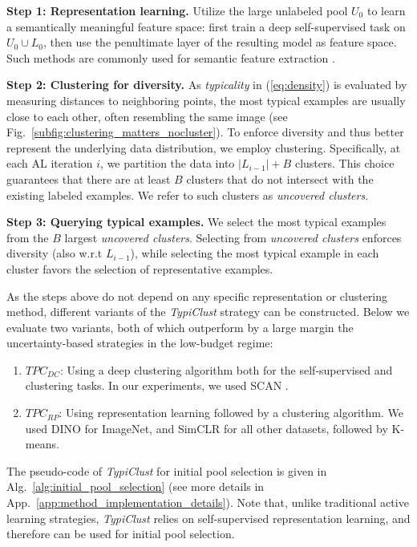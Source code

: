 \documentclass{article}
\newcommand{\myparagraph}[1]{\smallskip\noindent\textbf{#1}}
\newcommand{\tpcclustering}{TPC_{DC}}
\newcommand{\tpcrepresent}{TPC_{RP}}
\newcommand{\app}{App.}
\begin{document}
\myparagraph{Step 1: Representation learning.}
Utilize the large unlabeled pool $U_0$ to learn a semantically meaningful feature space: first train a deep self-supervised task on $U_0 \cup L_0$, then use the penultimate layer of the resulting model as feature space. Such methods are commonly used for semantic feature extraction \citep{chen2020simple, DBLP:conf/nips/GrillSATRBDPGAP20}.

\myparagraph{Step 2: Clustering for diversity.}
As \emph{typicality} in (\ref{eq:density}) is evaluated by measuring distances to neighboring points, the most typical examples are usually close to each other, often resembling the same image (see Fig.~\ref{subfig:clustering_matters_nocluster}). To enforce diversity and thus better represent the underlying data distribution, we employ clustering. Specifically, at each AL iteration $i$, we partition the data into $|L_{i-1}|+B$ clusters. This choice guarantees that there are at least $B$ clusters that do not intersect with the existing labeled examples. We refer to such clusters as \emph{uncovered clusters}.

\myparagraph{Step 3: Querying typical examples.}
We select the most typical examples from the $B$ largest \emph{uncovered clusters}. Selecting from \emph{uncovered clusters} enforces diversity (also w.r.t $L_{i-1}$), while selecting the most typical example in each cluster favors the selection of representative examples.

As the steps above do not depend on any specific representation or clustering method, different variants of the \emph{TypiClust} strategy can be constructed. Below we evaluate two variants, both of which outperform by a large margin the uncertainty-based strategies in the low-budget regime:
\begin{enumerate}
    \item \textit{$\tpcclustering$}: Using a deep clustering algorithm both for the self-supervised and clustering tasks. In our experiments, we used SCAN \citep{van2020scan}.
    \item \textit{$\tpcrepresent$}: Using representation learning followed by a clustering algorithm. We used DINO \citep{caron2021emerging} for ImageNet, and SimCLR \citep{chen2020simple} for all other datasets, followed by K-means.
\end{enumerate}
The pseudo-code of \emph{TypiClust} for initial pool selection is given in Alg.~\ref{alg:initial_pool_selection} (see more details in \app~\ref{app:method_implementation_details}). Note that, unlike traditional active learning strategies, \emph{TypiClust} relies on self-supervised representation learning, and therefore can be used for initial pool selection.
\end{document}

